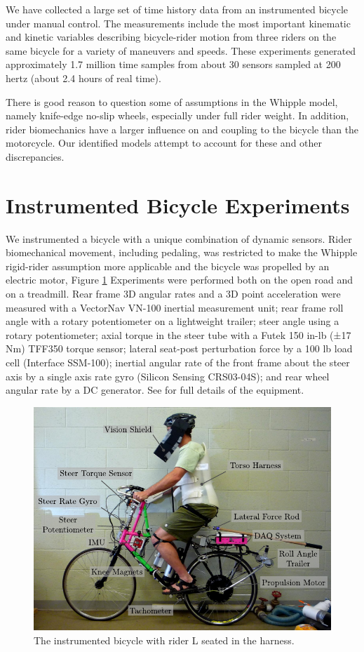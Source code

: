 \documentclass[a4paper]{article}
\begin{document}
We have collected a large set of
time history data from an instrumented bicycle under manual control. The
measurements include the most important kinematic and kinetic variables
describing bicycle-rider motion from three riders on the same
bicycle for a variety of maneuvers and speeds. These experiments generated
approximately 1.7 million time samples from about 30 sensors sampled at
200 hertz (about 2.4 hours of real time).

There is good reason to question some of assumptions in the Whipple model, namely knife-edge 
no-slip wheels, especially
under full rider weight. In addition, rider biomechanics have a larger
influence on and coupling to the bicycle than the motorcycle. Our identified models 
attempt to account for these and other discrepancies.

\section{Instrumented Bicycle Experiments}

We instrumented a bicycle with a unique combination of dynamic sensors. 
Rider biomechanical movement, including pedaling, was
    restricted to make the Whipple rigid-rider
    assumption more applicable and the bicycle was propelled by an electric
motor, Figure
\ref{fig:instrumented-bicycle} 
Experiments were performed both on the open road and on a treadmill.
Rear frame 3D angular rates
and a 3D point acceleration were measured with a VectorNav
VN-100 inertial measurement unit; rear frame roll angle with a
rotary potentiometer on a lightweight trailer; steer angle
using a rotary potentiometer; axial torque in the steer tube with
a Futek 150 in-lb (±17 Nm) TFF350 torque sensor; lateral seat-post perturbation force
by a 100 lb load cell (Interface SSM-100); inertial angular rate
of the front frame about the steer axis by a single axis rate gyro
(Silicon Sensing CRS03-04S); and rear wheel angular rate by a DC generator.
See \cite{Moore2012} for full details of the equipment.

\begin{figure}
  \label{fig:instrumented-bicycle}
  \includegraphics[width=5in]{figures/instrumented-bicycle.pdf}
  \caption{The instrumented bicycle with rider L seated in the harness.}
\end{figure}
\end{document}
